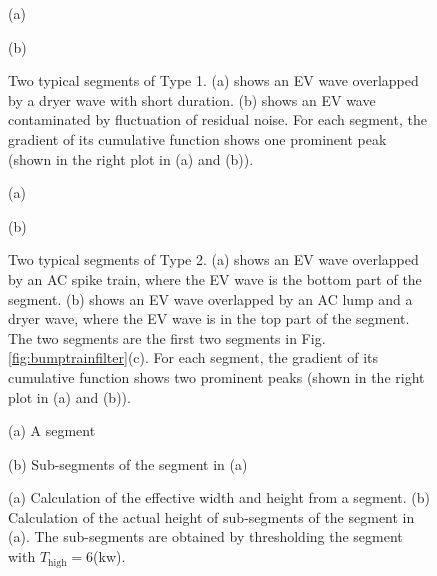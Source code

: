 \documentclass[conference]{IEEEtran}
\begin{document}
\begin{figure}[!t]
\begin{minipage}[b]{.48\linewidth}
  \centering
  \centerline{}
  \centerline{\footnotesize{(a)}}
\end{minipage}
\hfill
\begin{minipage}[b]{0.48\linewidth}
  \centering
  \centerline{}
  \centerline{\footnotesize{(b)}}
\end{minipage}
\caption{\footnotesize{Two typical segments of Type 1. (a) shows an EV wave overlapped by a dryer wave with short duration. (b) shows an EV wave contaminated by fluctuation of residual noise. For each segment, the gradient of its cumulative function shows one prominent peak (shown in the right plot in (a) and (b)).}}
\label{fig:type1}
\end{figure}



\begin{figure}[!t]
\begin{minipage}[b]{.48\linewidth}
  \centering
  \centerline{}
  \centerline{\footnotesize{(a)}}
\end{minipage}
\hfill
\begin{minipage}[b]{0.48\linewidth}
  \centering
  \centerline{}
  \centerline{\footnotesize{(b)}}
\end{minipage}
\caption{\footnotesize{Two typical segments of Type 2. (a) shows an EV wave overlapped by an AC spike train, where the EV wave is the bottom part of the segment. (b) shows an EV wave overlapped by an AC lump and a dryer wave, where the EV wave is in the top part of the segment. The two segments are the first two segments in Fig.\ref{fig:bumptrainfilter}(c). For each segment, the gradient of its cumulative function shows two prominent peaks (shown in the right plot in (a) and (b)).}}
\label{fig:type2}
\end{figure}






\begin{figure}[!t]
\begin{minipage}[b]{.48\linewidth}
  \centering
  \centerline{}
  \centerline{\footnotesize{(a) A segment}}
\end{minipage}
\hfill
\begin{minipage}[b]{0.48\linewidth}
  \centering
  \centerline{}
  \centerline{\footnotesize{(b) Sub-segments of the segment in (a)}}
\end{minipage}
\caption{\footnotesize{(a) Calculation of the effective width and height from a segment. (b) Calculation of the actual height of sub-segments of the segment in (a). The sub-segments are obtained by thresholding the segment with $T_{\mathrm{high}}=6$(kw).}}
\label{fig:EV_width}
\end{figure}
\end{document}
